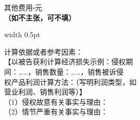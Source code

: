 \begin{tcolorbox}
\begin{minipage}[t]{168bp}
    其他费用$\square$\hspace{2em}元\\
    {\heiti\bfseries（如不主张，可不填）}%
    \vspace{4bp}%
\end{minipage}%
\vrule width 0.5pt%
\hspace{4bp}%
\begin{minipage}[t]{170bp}%
    \vspace{4bp}%
    \songti\mdseries\fontsize{10.5bp}{17bp}\selectfont%
    \baselineskip=17bp\setlength{\parindent}{0pt}\color{inkblack}%
    计算依据或者参考因素：\\[6bp]
    【以被告获利计算经济损失示例：侵权期\\
    间：……，销售数量：……，销售被诉侵\\
    权产品利润计算方法：（写明利润类型，如\\
    营业利润、销售利润等）】\\[6bp]
    （1）侵权故意有关事实与理由：\\[6bp]
    （2）情节严重有关事实与理由：%
    \vspace{4bp}%
\end{minipage}%
\end{tcolorbox}




\vspace{10bp}
\noindent{}\par
\noindent{}


